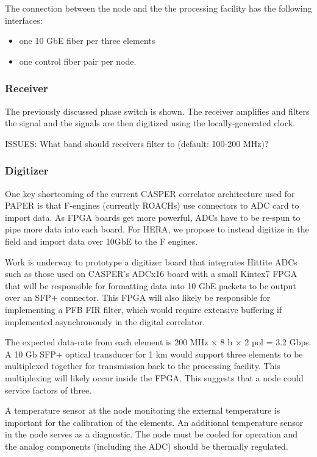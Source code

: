 \documentclass[11pt]{article}
\begin{document}
The connection between the node and the the processing facility has the following interfaces:
\begin{itemize}
\item one 10 GbE fiber per three elements
\item one control fiber pair per node.
\end{itemize}

\subsubsection{Receiver}

The previously discussed phase switch is shown.  The receiver amplifies and
filters the signal and the signals are then digitized using the
locally-generated clock.  

ISSUES: What band should receivers filter to (default: 100-200 MHz)?

\subsubsection{Digitizer}

One key shortcoming of the current CASPER correlator architecture used for PAPER is
that F-engines (currently ROACHs) use connectors to ADC card to import data.  As
FPGA boards get more powerful, ADCs have to be re-spun to pipe more data into each
board.  For HERA, we propose to instead digitize in the field and import data
over 10GbE to the F engines.

Work is underway to prototype a digitizer board that integrates Hittite ADCs
such as those used on CASPER's ADCx16 board with a small Kintex7 FPGA
that will be responsible for formatting data into 10 GbE packets to be output
over an SFP+ connector.  This FPGA will also likely be responsible for implementing
a PFB FIR filter, which would require extensive buffering if implemented asynchronously
in the digital correlator.

The expected data-rate from each element is 200 MHz $\times$ 8 b $\times$ 2 pol
= 3.2 Gbps.  A 10 Gb SFP+ optical transducer for 1 km would support three
elements to be multiplexed together for transmission back to the processing
facility.  This multiplexing will likely occur inside the FPGA.
This suggests that a node could service
factors of three. 

A temperature sensor at the node monitoring the external temperature is
important for the calibration of the elements.  An additional temperature
sensor in the node serves as a diagnostic.  The node must be cooled for
operation and the analog components (including the ADC) should be thermally
regulated.
\end{document}
